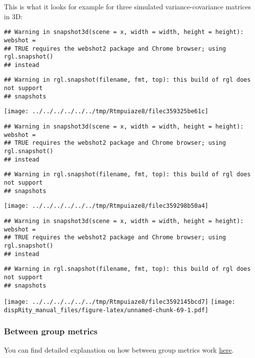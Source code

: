 \documentclass[
]{book}
\begin{document}
This is what it looks for example for three simulated variance-covariance matrices in 3D:

\begin{verbatim}
## Warning in snapshot3d(scene = x, width = width, height = height): webshot =
## TRUE requires the webshot2 package and Chrome browser; using rgl.snapshot()
## instead
\end{verbatim}

\begin{verbatim}
## Warning in rgl.snapshot(filename, fmt, top): this build of rgl does not support
## snapshots
\end{verbatim}

\texttt{[image: ../../../../../../tmp/Rtmpuiaze8/filec359325be61c]}

\begin{verbatim}
## Warning in snapshot3d(scene = x, width = width, height = height): webshot =
## TRUE requires the webshot2 package and Chrome browser; using rgl.snapshot()
## instead
\end{verbatim}

\begin{verbatim}
## Warning in rgl.snapshot(filename, fmt, top): this build of rgl does not support
## snapshots
\end{verbatim}

\texttt{[image: ../../../../../../tmp/Rtmpuiaze8/filec359298b50a4]}

\begin{verbatim}
## Warning in snapshot3d(scene = x, width = width, height = height): webshot =
## TRUE requires the webshot2 package and Chrome browser; using rgl.snapshot()
## instead
\end{verbatim}

\begin{verbatim}
## Warning in rgl.snapshot(filename, fmt, top): this build of rgl does not support
## snapshots
\end{verbatim}

\texttt{[image: ../../../../../../tmp/Rtmpuiaze8/filec3592145bcd7]}
\texttt{[image: dispRity\_manual\_files/figure-latex/unnamed-chunk-69-1.pdf]}

\hypertarget{betweengroupmetricslist}{%
\subsubsection{Between group metrics}\label{betweengroupmetricslist}}

You can find detailed explanation on how between group metrics work \protect\hyperlink{betweengroupmetricsexplain}{here}.
\end{document}
